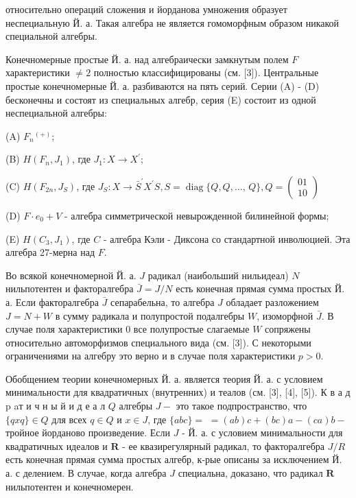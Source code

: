 \documentclass[10pt]{article}
\begin{document}
относительно операций сложения и йорданова умножения образует неспециальную Й. а. Такая алгебра не является гомоморфным образом никакой специальной алгебры.



Конечномерные простые Й. а. над алгебраически замкнутым полем $F$ характеристики $\neq 2$ полностью классифицированы (см. [3]). Центральные простые конечномерные Й. а. разбиваются на пять серий. Серии (A) - (D) бесконечны и состоят из специальных алгебр, серия (E) состоит из одной неспециальной алгебры:



(A) $F_{n}{ }^{(+)}$;



(B) $H\left(F_{n}, J_{1}\right)$, где $J_{1}: X \rightarrow X^{\prime}$;



(C) $H\left(F_{2 n}, J_{S}\right)$, где $J_{S}: X \rightarrow \bar{S}^{\prime} X^{\prime} S, S=\operatorname{diag}\{Q, Q, \ldots$, $Q\}, Q=\left(\begin{array}{c}01 \\ 10\end{array}\right)$



(D) $F \cdot e_{0}+V$ - алгебра симметрической невырожденной билинейной формы;



(E) $H\left(C_{3}, J_{1}\right)$, где $C$ - алгебра Кэли - Диксона со стандартной инволюцией. Эта алгебра 27-мерна над $F$.



Во всякой конечномерной Й. а. $J$ радикал (наибольший нильидеал) $N$ нильпотентен и факторалгебра $\bar{J}=J / N$ есть конечная прямая сумма простых Й. а. Если факторалгебра $\bar{J}$ сепарабельна, то алгебра $J$ обладает разложением $J=N+W$ в сумму радикала и полупростой подалгебры $W$, изоморфной $\bar{J}$. В случае поля характеристики 0 все полупростые слагаемые $W$ сопряжены относительно автоморфизмов специального вида (см. [3]). С некоторыми ограничениями на алгебру это верно и в случае поля характеристики $p>0$.



Обобщением теории конечномерных Й. а. является теория Й. а. с условием минимальности для квадратичных (внутренних) и теалов (см. [3], [4], [5]). К в а д p aт и ч н ы й и д е а л $Q$ алгебры $J-$ это такое подпространство, что $\{q x q\} \in Q$ для всех $q \in Q$ и $x \in J$, где $\{a b c\}=$ $=(a b) c+(b c) a-(c a) b-$ тройное йорданово произведение. Если $J$ - Й. а. с условием минимальности для квадратичных идеалов и $\boldsymbol{R}$ - ее квазирегулярный радикал, то факторалгебра $J / R$ есть конечная прямая сумма простых алгебр, к-рые описаны за исключением Й. а. с делением. В случае, когда алгебра $J$ специальна, доказано, что радикал $\boldsymbol{R}$ нильпотентен и конечномерен.
\end{document}
